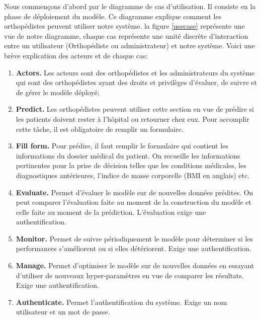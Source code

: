 \documentclass[12pt, french]{report}
\begin{document}
Nous commençons d'abord par le diagramme de cas d'utilisation. Il consiste en la phase de déploiement du modèle. Ce diagramme explique comment les orthopédistes peuvent utiliser notre système. la figure \ref{usecase} représente une vue de notre diagramme, chaque cas représente une unité discrète d'interaction entre un utilisateur (Orthopédiste ou administrateur) et notre système. Voici une brève explication des acteurs et de chaque cas:
\begin{enumerate}
	\item \textbf{Actors.} Les acteurs sont des orthopédistes et les administrateurs du système qui sont des orthopédistes ayant des droits et privilèges d'évaluer, de suivre et de gérer le modèle déployé;
	\item \textbf{Predict.} Les orthopédistes peuvent utiliser cette section en vue de prédire si les patients doivent rester à l'hôpital ou retourner chez eux. Pour accomplir cette tâche, il est obligatoire de remplir un formulaire.
	\item \textbf{Fill form.} Pour prédire, il faut remplir le formulaire qui contient les informations du dossier médical du patient. On recueille les informations pertinentes pour la prise de décision telles que les conditions médicales, les diagnostiques antérieures, l'indice de masse corporelle (BMI en anglais) etc. 
	\item \textbf{Evaluate.} Permet d'évaluer le modèle sur de nouvelles données prédites. On peut comparer l'évaluation faite au moment de la construction du modèle et celle faite au moment de la prédiction. L'évaluation exige une authentification.  
	\item \textbf{Monitor.} Permet de suivre périodiquement le modèle pour déterminer si les performances s'améliorent ou si elles détériorent. Exige une authentification.
	\item \textbf{Manage.} Permet d'optimiser le modèle sur de nouvelles données en essayant d'utiliser de nouveaux hyper-paramètres en vue de comparer les résultats. Exige une authentification.
	\item \textbf{Authenticate.} Permet l'authentification du système. Exige un nom utilisateur et un mot de passe.
\end{enumerate}
\end{document}
